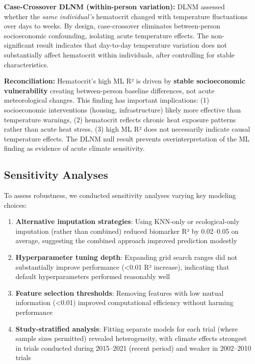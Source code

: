 \textbf{Case-Crossover DLNM (within-person variation):} DLNM assessed whether the \textit{same individual's} hematocrit changed with temperature fluctuations over days to weeks. By design, case-crossover eliminates between-person socioeconomic confounding, isolating acute temperature effects. The non-significant result indicates that day-to-day temperature variation does not substantially affect hematocrit within individuals, after controlling for stable characteristics.

\textbf{Reconciliation:} Hematocrit's high ML R² is driven by \textbf{stable socioeconomic vulnerability} creating between-person baseline differences, not acute meteorological changes. This finding has important implications: (1) socioeconomic interventions (housing, infrastructure) likely more effective than temperature warnings, (2) hematocrit reflects chronic heat exposure patterns rather than acute heat stress, (3) high ML R² does not necessarily indicate causal temperature effects. The DLNM null result prevents overinterpretation of the ML finding as evidence of acute climate sensitivity.

\subsection{Sensitivity Analyses}

To assess robustness, we conducted sensitivity analyses varying key modeling choices:

\begin{enumerate}
    \item \textbf{Alternative imputation strategies}: Using KNN-only or ecological-only imputation (rather than combined) reduced biomarker R² by 0.02--0.05 on average, suggesting the combined approach improved prediction modestly

    \item \textbf{Hyperparameter tuning depth}: Expanding grid search ranges did not substantially improve performance (<0.01 R² increase), indicating that default hyperparameters performed reasonably well

    \item \textbf{Feature selection thresholds}: Removing features with low mutual information (<0.01) improved computational efficiency without harming performance

    \item \textbf{Study-stratified analysis}: Fitting separate models for each trial (where sample sizes permitted) revealed heterogeneity, with climate effects strongest in trials conducted during 2015--2021 (recent period) and weaker in 2002--2010 trials
\end{enumerate}
